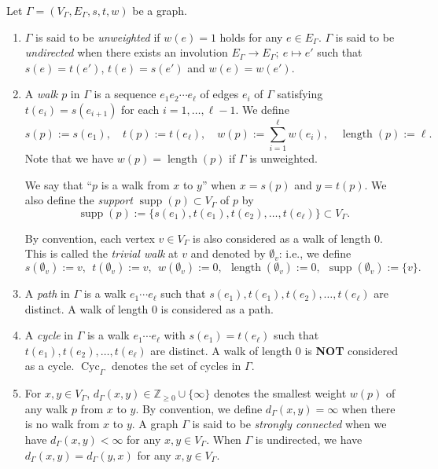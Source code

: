 \documentclass[11pt]{article}
\theoremstyle{definition}
\numberwithin{equation}{section}
\begin{document}
\begin{defn}
Let $\Gamma = (V_{\Gamma}, E_{\Gamma}, s, t, w)$ be a graph. 

\begin{enumerate}
\item 
$\Gamma$ is said to be \textit{unweighted} if $w(e) = 1$ holds for any $e \in E_{\Gamma}$. 
$\Gamma$ is said to be \textit{undirected} when 
there exists an involution $E_{\Gamma} \to E_{\Gamma};\ e \mapsto e'$
such that $s(e)=t(e')$, $t(e)=s(e')$ and $w(e)=w(e')$. 

\item
A \textit{walk} $p$ in $\Gamma$ is a sequence $e_1 e_2 \cdots e_{\ell}$ of edges $e_i$ of $\Gamma$ satisfying 
$t(e_i) = s(e_{i+1})$ for each $i = 1, \ldots , \ell -1$. 
We define 
\[
s(p) := s(e_1), \quad
t(p) := t(e_{\ell}), \quad
w(p) := \sum _{i = 1} ^{\ell} w(e_i), \quad 
\operatorname{length}(p) := \ell. 
\]
Note that we have $w(p) = \operatorname{length}(p)$ if $\Gamma$ is unweighted. 


We say that ``$p$ is a walk from $x$ to $y$'' when $x = s(p)$ and $y = t(p)$. 
We also define the \textit{support} $\operatorname{supp}(p) \subset V_{\Gamma}$ of $p$ by
\[
\operatorname{supp}(p) := \{ s(e_1), t(e_1), t(e_2), \ldots , t(e_{\ell}) \} \subset V_{\Gamma}. 
\]

By convention, each vertex $v \in V_{\Gamma}$ is also considered as a walk of length $0$. 
This is called the \textit{trivial walk} at $v$ and denoted by $\emptyset _v$: i.e., 
we define 
\[
s(\emptyset _v) := v, \ \ 
t(\emptyset _v) := v, \ \ 
w(\emptyset _v) := 0, \ \  
\operatorname{length}(\emptyset _v) := 0, \ \ 
\operatorname{supp}(\emptyset _v) := \{ v \}.
\]

\item 
A \textit{path} in $\Gamma$ is a walk $e_1 \cdots e_{\ell}$ such that $s(e_1), t(e_1), t(e_2), \ldots, t(e_{\ell})$ are distinct. 
A walk of length $0$ is considered as a path. 

\item
A \textit{cycle} in $\Gamma$ is a walk $e_1 \cdots e_{\ell}$ with $s(e_1) = t(e_{\ell})$ 
such that $t(e_1), t(e_2), \ldots, t(e_{\ell})$ are distinct. 
A walk of length $0$ is \textbf{NOT} considered as a cycle. 
$\operatorname{Cyc}_{\Gamma}$ denotes the set of cycles in $\Gamma$. 

\item 
For $x, y \in V_{\Gamma}$, $d_{\Gamma}(x, y) \in \mathbb{Z}_{\ge 0} \cup \{ \infty \}$ denotes the smallest weight $w(p)$ of any walk $p$ from $x$ to $y$. 
By convention, we define $d_{\Gamma}(x, y) = \infty$ when there is no walk from $x$ to $y$. 
A graph $\Gamma$ is said to be \textit{strongly connected} 
when we have $d_{\Gamma}(x, y) < \infty$ for any $x, y \in V_{\Gamma}$. 
When $\Gamma$ is undirected, we have $d_{\Gamma}(x,y) = d_{\Gamma}(y,x)$ for any $x,y \in V_{\Gamma}$. 


\end{enumerate}
\end{defn}
\end{document}
